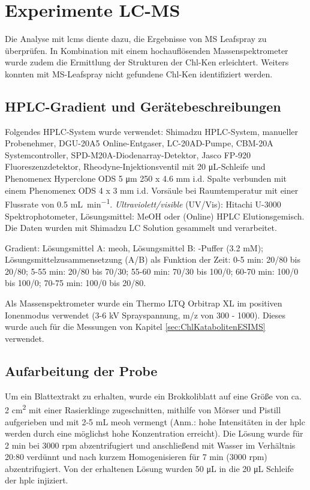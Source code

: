 \chapter{Experimente LC-MS} 

Die Analyse mit \gls{lcms} diente dazu, die Ergebnisse von MS Leafspray zu überprüfen. In Kombination mit einem hochauflösenden Massenspektrometer wurde zudem die Ermittlung der Strukturen der \gls{Chl-K}en erleichtert. Weiters konnten mit MS-Leafspray nicht gefundene \gls{Chl-K}en identifiziert werden. \\

\section{HPLC-Gradient und Gerätebeschreibungen} \label{sec:HPLCGradient} 

Folgendes HPLC-System wurde verwendet: Shimadzu HPLC-System, manueller Probenehmer, DGU-20A5 Online-Entgaser, LC-20AD-Pumpe, CBM-20A Systemcontroller, SPD-M20A-Diodenarray-Detektor, Jasco FP-920 Fluoreszenzdetektor, Rheodyne-Injektionsventil mit 20 \si{\uL}-Schleife und Phenomenex Hyperclone ODS 5 \si{\um} 250 x 4.6 mm i.d. Spalte verbunden mit einem Phenomenex ODS 4 x 3 mm i.d. Vorsäule bei Raumtemperatur mit einer Flussrate von 0.5 \si{\mL\per\minute}. \textit{Ultraviolett/visible} (UV/Vis): Hitachi U-3000 Spektrophotometer, Lösungsmittel: MeOH oder (Online) HPLC Elutionsgemisch. Die Daten wurden mit Shimadzu LC Solution gesammelt und verarbeitet. 

Gradient: Lösungsmittel A: \gls{meoh}, Lösungsmittel B: -Puffer (3.2 mM); Lösungsmittelzusammensetzung (A/B) als Funktion der Zeit: 0-5 min: 20/80 bis 20/80; 5-55 min: 20/80 bis 70/30; 55-60 min: 70/30 bis 100/0; 60-70 min: 100/0 bis 100/0; 70-75 min: 100/0 bis 20/80.

Als Massenspektrometer wurde ein Thermo LTQ Orbitrap XL im positiven Ionenmodus verwendet (3-6 kV Sprayspannung, m/z von 300 - 1000). Dieses wurde auch für die Messungen von Kapitel \ref{sec:ChlKatabolitenESIMS} verwendet.

\section{Aufarbeitung der Probe} \label{sec:HPLCAufarbeitungderProbe}

Um ein Blattextrakt zu erhalten, wurde ein Brokkoliblatt auf eine Größe von ca. 2 \si{cm^{2}} mit einer Rasierklinge zugeschnitten, mithilfe von Mörser und Pistill aufgerieben und mit 2-5 mL \gls{meoh} vermengt (Anm.: hohe Intensitäten in der \gls{hplc} werden durch eine möglichst hohe Konzentration erreicht). Die Lösung wurde für 2 min bei 3000 rpm abzentrifugiert und anschließend mit Wasser im Verhältnis 20:80 verdünnt und nach kurzem Homogenisieren für 7 min (3000 rpm) abzentrifugiert. Von der erhaltenen Lösung wurden 50 \si{\uL} in die 20 \si{\uL} Schleife der \gls{hplc} injiziert. 

